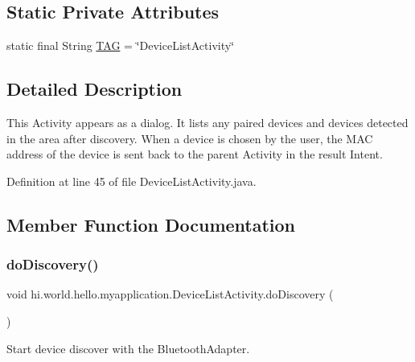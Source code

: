 \subsection*{Static Private Attributes}
\begin{DoxyCompactItemize}
\item 
static final String \mbox{\hyperlink{classhi_1_1world_1_1hello_1_1myapplication_1_1_device_list_activity_a54fe4b51cb417f2ceac0f57b1e21d991}{T\+AG}} = \char`\"{}Device\+List\+Activity\char`\"{}
\end{DoxyCompactItemize}


\subsection{Detailed Description}
This Activity appears as a dialog. It lists any paired devices and devices detected in the area after discovery. When a device is chosen by the user, the M\+AC address of the device is sent back to the parent Activity in the result Intent. 

Definition at line 45 of file Device\+List\+Activity.\+java.



\subsection{Member Function Documentation}
\mbox{\label{classhi_1_1world_1_1hello_1_1myapplication_1_1_device_list_activity_a5e5f542b8b5614616f5b759c6b46a3f0}} 
\subsubsection{\texorpdfstring{doDiscovery()}{doDiscovery()}}
{\footnotesize\ttfamily void hi.\+world.\+hello.\+myapplication.\+Device\+List\+Activity.\+do\+Discovery (\begin{DoxyParamCaption}{ }\end{DoxyParamCaption})\hspace{0.3cm}{\ttfamily [private]}}



Start device discover with the Bluetooth\+Adapter. 


